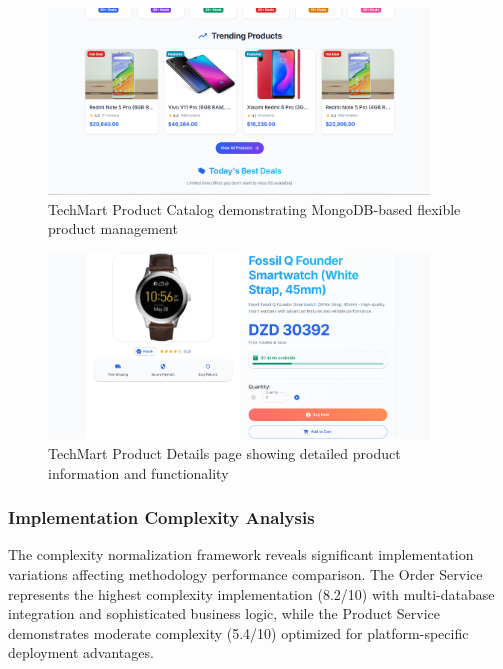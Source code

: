 \begin{figure}[H]
\centering
\includegraphics[width=0.9\textwidth]{figures/chapter5/techmart-products-catalog.png}
\caption{TechMart Product Catalog demonstrating MongoDB-based flexible product management}
\label{fig:techmart-products-catalog}
\end{figure}

\begin{figure}[H]
\centering
\includegraphics[width=0.9\textwidth]{figures/chapter5/techmart-product-details.png}
\caption{TechMart Product Details page showing detailed product information and functionality}
\label{fig:techmart-product-details}
\end{figure}

\subsubsection{Implementation Complexity Analysis}

The complexity normalization framework reveals significant implementation variations affecting methodology performance comparison. The Order Service represents the highest complexity implementation (8.2/10) with multi-database integration and sophisticated business logic, while the Product Service demonstrates moderate complexity (5.4/10) optimized for platform-specific deployment advantages.

